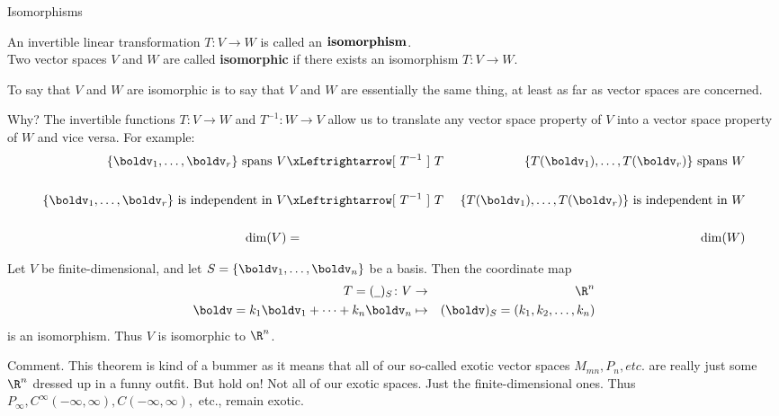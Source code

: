 \begin{frame}{Isomorphisms}
\footnotesize
\begin{definition}
An invertible linear transformation $T\colon V\rightarrow W$ is called an ${\bf isomorphism}$. 
\\
Two vector spaces $V$ and $W$ are called {\bf isomorphic} if there exists an isomorphism $T\colon V\rightarrow W$. 
\end{definition}
\pause To say that $V$ and $W$ are isomorphic is to say that $V$ and $W$ are \alert{essentially the same thing}, at least as far as vector spaces are concerned. 

\bpause 
Why? The invertible functions $T\colon V\rightarrow W$ and $T^{-1}\colon W\rightarrow V$ allow us to \alert{translate} any vector space property of $V$ into a vector space property of $W$ and vice versa. For example: 
\begin{eqnarray*}
\{\boldv_1,\dots , \boldv_r\} \text{ spans } V &\xLeftrightarrow[\ T^{-1} \ ]{\ T \ }& \{T(\boldv_1),\dots , T(\boldv_r)\} \text{ spans } W\\ \\
\{\boldv_1,\dots , \boldv_r\} \text{ is independent in } V &\xLeftrightarrow[\ T^{-1} \ ]{\ T \ }& \{T(\boldv_1),\dots , T(\boldv_r)\} \text{ is independent in } W\\ \\
\dim(V)&=&\dim(W)
\end{eqnarray*}  

\end{frame}
\begin{frame}
\begin{theorem}
Let $V$ be finite-dimensional, and let $S=\{\boldv_1,\dots ,\boldv_n\}$ be a basis. Then the coordinate map 
\begin{eqnarray*}
T=(\underline{\hspace{5pt}})_S\colon V&\rightarrow& \R^n\\
\boldv=k_1\boldv_1+\cdots +k_n\boldv_n&\mapsto&(\boldv)_S=(k_1,k_2,\dots,k_n)
\end{eqnarray*}
is an isomorphism. Thus $V$ is isomorphic to $\R^n$. 
\end{theorem}
\pause
\alert{Comment}. This theorem is kind of a bummer as it means that all of our so-called exotic vector spaces $M_{mn}, P_n, etc.$ are really just some $\R^n$ dressed up in a funny outfit. 
\bpause 
But hold on! Not \alert{all} of our exotic spaces. Just the \alert{finite-dimensional} ones. Thus $P_{\infty}, C^\infty(-\infty,\infty), C(-\infty,\infty), $ etc., remain exotic. 
\end{frame}
